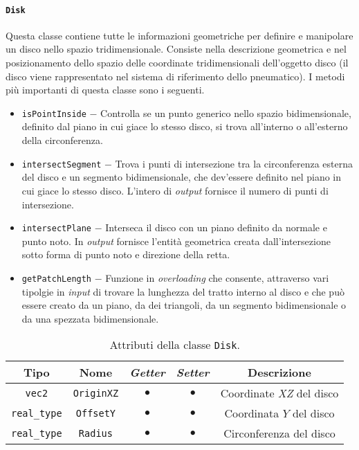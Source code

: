 \paragraph{\texttt{Disk}}
Questa classe contiene tutte le informazioni geometriche per definire e manipolare un disco nello spazio tridimensionale. Consiste nella descrizione geometrica e nel posizionamento dello spazio delle coordinate tridimensionali dell'oggetto disco (il disco viene rappresentato nel sistema di riferimento dello pneumatico). I metodi più importanti di questa classe sono i seguenti.
\begin{itemize}
	\item \texttt{isPointInside} $-$ Controlla se un punto generico nello spazio bidimensionale, definito dal piano in cui giace lo stesso disco, si trova all'interno o all'esterno della circonferenza.
	\item \texttt{intersectSegment} $-$ Trova i punti di intersezione tra la circonferenza esterna del disco e un segmento bidimensionale, che dev'essere definito nel piano in cui giace lo stesso disco. L'intero di \textit{output} fornisce il numero di punti di intersezione.
	\item \texttt{intersectPlane} $-$ Interseca il disco con un piano definito da normale e punto noto. In \textit{output} fornisce l'entità geometrica creata dall'intersezione sotto forma di punto noto e direzione della retta.
	\item \texttt{getPatchLength} $-$ Funzione in \textit{overloading} che consente, attraverso vari tipolgie in \textit{input} di trovare la lunghezza del tratto interno al disco e che può essere creato da un piano, da dei triangoli, da un segmento bidimensionale o da una spezzata bidimensionale.
\end{itemize}
\begin{table}[h!]
	\centering
	\begin{tabular}{|c|c|c|c|c|}
		\hline 
		\textbf{Tipo} & \textbf{Nome} & \textit{\textbf{Getter}} & \textit{\textbf{Setter}} & \textbf{Descrizione} \\ \hline 
		\texttt{vec2} & \texttt{OriginXZ} & $\bullet$ & $\bullet$ & Coordinate \textit{XZ} del disco \\ \hline 
		\texttt{real\_type} & \texttt{OffsetY} & $\bullet$ & $\bullet$ & Coordinata $Y$ del disco \\ \hline
		\texttt{real\_type} & \texttt{Radius} & $\bullet$ & $\bullet$ & Circonferenza del disco \\ \hline
	\end{tabular}
	\caption{Attributi della classe \texttt{Disk}.}
	\label{}
\end{table}
%
